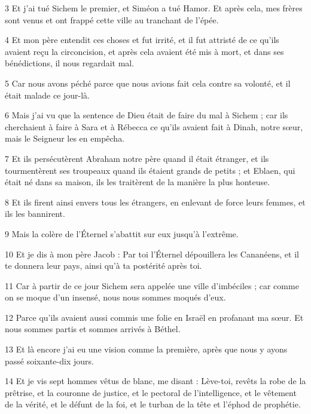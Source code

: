 \par 3 Et j'ai tué Sichem le premier, et Siméon a tué Hamor. Et après cela, mes frères sont venus et ont frappé cette ville au tranchant de l'épée.

\par 4 Et mon père entendit ces choses et fut irrité, et il fut attristé de ce qu'ils avaient reçu la circoncision, et après cela avaient été mis à mort, et dans ses bénédictions, il nous regardait mal.

\par 5 Car nous avons péché parce que nous avions fait cela contre sa volonté, et il était malade ce jour-là.

\par 6 Mais j'ai vu que la sentence de Dieu était de faire du mal à Sichem ; car ils cherchaient à faire à Sara et à Rébecca ce qu'ils avaient fait à Dinah, notre sœur, mais le Seigneur les en empêcha.

\par 7 Et ils persécutèrent Abraham notre père quand il était étranger, et ils tourmentèrent ses troupeaux quand ils étaient grands de petits ; et Eblaen, qui était né dans sa maison, ils les traitèrent de la manière la plus honteuse.

\par 8 Et ils firent ainsi envers tous les étrangers, en enlevant de force leurs femmes, et ils les bannirent.

\par 9 Mais la colère de l'Éternel s'abattit sur eux jusqu'à l'extrême.

\par 10 Et je dis à mon père Jacob : Par toi l'Éternel dépouillera les Cananéens, et il te donnera leur pays, ainsi qu'à ta postérité après toi.

\par 11 Car à partir de ce jour Sichem sera appelée une ville d'imbéciles ; car comme on se moque d'un insensé, nous nous sommes moqués d'eux.

\par 12 Parce qu'ils avaient aussi commis une folie en Israël en profanant ma sœur. Et nous sommes partis et sommes arrivés à Béthel.

\par 13 Et là encore j'ai eu une vision comme la première, après que nous y ayons passé soixante-dix jours.

\par 14 Et je vis sept hommes vêtus de blanc, me disant : Lève-toi, revêts la robe de la prêtrise, et la couronne de justice, et le pectoral de l'intelligence, et le vêtement de la vérité, et le défunt de la foi, et le turban de la tête et l'éphod de prophétie.


